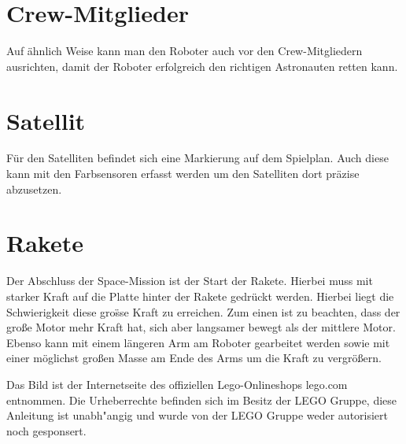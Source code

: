 \documentclass[
	ngerman,
	accentcolor=1c,%
	marginpar=false,
	identbarcolor=1c,
	]{tudapub}
\begin{document}
\section{Crew-Mitglieder}
Auf \"ahnlich Weise kann man den Roboter auch vor den Crew-Mitgliedern ausrichten, damit der Roboter erfolgreich den richtigen Astronauten retten kann.

\section{Satellit}
F\"ur den Satelliten befindet sich eine Markierung auf dem Spielplan. Auch diese kann mit den Farbsensoren erfasst werden um den Satelliten dort pr\"azise abzusetzen.

\section{Rakete}
Der Abschluss der Space-Mission ist der Start der Rakete. Hierbei muss mit starker Kraft auf die Platte hinter der Rakete gedr\"uckt werden. Hierbei liegt die Schwierigkeit diese gro\"ss{}e Kraft zu erreichen. Zum einen ist zu beachten, dass der gro\ss{}e Motor mehr Kraft hat, sich aber langsamer bewegt als der mittlere Motor. Ebenso kann mit einem l\"angeren Arm am Roboter gearbeitet werden sowie mit einer m\"oglichst gro\ss{}en Masse am Ende des Arms um die Kraft zu vergr\"o\ss{}ern.

\bigskip \bigskip \bigskip

\tiny Das Bild ist der Internetseite des offiziellen Lego-Onlineshops lego.com entnommen. Die Urheberrechte befinden sich im Besitz der LEGO Gruppe, diese Anleitung ist unabh"angig und wurde von der LEGO Gruppe weder autorisiert noch gesponsert.
\cfoot{\textcolor{lightgray} \today}
\end{document}
